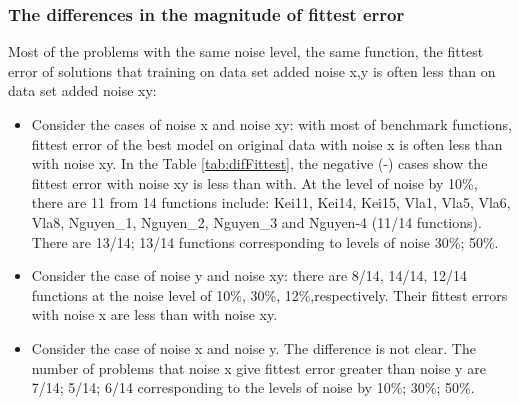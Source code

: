 \subsubsection{The differences in the magnitude of fittest error}
\label{AnaDiffMag}
Most of the problems with the same noise level, the same function, the fittest error of solutions that training on data set added noise x,y is often less than on data set added noise xy:
\begin{itemize}
\item Consider the cases of noise x and noise xy: with most of benchmark functions, fittest error of the best model on original data with noise x is often less than with noise xy. In the Table \ref{tab:difFittest}, the negative (-) cases show the fittest error with noise xy is less than with. At the level of noise by 10\%, there are 11 from 14 functions include: Kei11, Kei14, Kei15, Vla1, Vla5, Vla6, Vla8, Nguyen\_1, Nguyen\_2, Nguyen\_3 and Nguyen-4 (11/14 functions). There are 13/14; 13/14 functions corresponding to levels of noise 30\%; 50\%.
\item Consider the case of noise y and noise xy: there are 8/14, 14/14, 12/14 functions at the noise level of 10\%, 30\%, 12\%,respectively. Their fittest errors with noise x are less than with noise xy.
\item Consider the case of noise x and noise y. The difference is not clear. The number of problems that noise x give fittest error greater than noise y are 7/14; 5/14; 6/14 corresponding to the levels of noise by 10\%; 30\%; 50\%.
\end{itemize} \par
